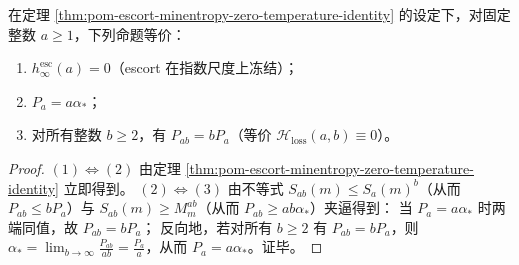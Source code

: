 \begin{corollary}\label{cor:pom-escort-freezing-criterion}
在定理 \ref{thm:pom-escort-minentropy-zero-temperature-identity} 的设定下，对固定整数 \(a\ge 1\)，下列命题等价：
\begin{enumerate}
  \item \(h_\infty^{\mathrm{esc}}(a)=0\)（escort 在指数尺度上冻结）；
  \item \(P_a=a\alpha_\ast\)；
  \item 对所有整数 \(b\ge 2\)，有 \(P_{ab}=bP_a\)（等价 \(\mathcal{H}_{\mathrm{loss}}(a,b)\equiv 0\)）。
\end{enumerate}
\end{corollary}
\begin{proof}
\((1)\Longleftrightarrow(2)\) 由定理 \ref{thm:pom-escort-minentropy-zero-temperature-identity} 立即得到。
\((2)\Longleftrightarrow(3)\) 由不等式 \(S_{ab}(m)\le S_a(m)^b\)（从而 \(P_{ab}\le bP_a\)）与 \(S_{ab}(m)\ge M_m^{ab}\)（从而 \(P_{ab}\ge ab\alpha_\ast\)）夹逼得到：
当 \(P_a=a\alpha_\ast\) 时两端同值，故 \(P_{ab}=bP_a\)；
反向地，若对所有 \(b\ge 2\) 有 \(P_{ab}=bP_a\)，则
\(
\alpha_\ast=\lim_{b\to\infty}\frac{P_{ab}}{ab}=\frac{P_a}{a}
\)，从而 \(P_a=a\alpha_\ast\)。证毕。
\end{proof}

